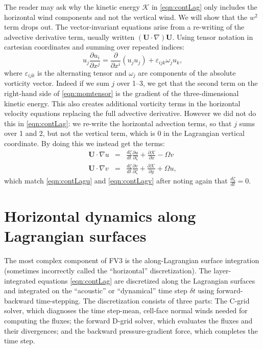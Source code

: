 \documentclass[10pt,letterpaper,margin=1in]{memoir}
\begin{document}
\begin{subappendices}
The reader may ask why the kinetic energy $\mathcal{K}$ in \eqref{eqn:contLag} only includes the horizontal wind components and not the vertical wind. We will show that the $w^2$ term drops out. The vector-invariant equations arise from a re-writing of the advective derivative term, usually written $\left (\mathbf{U} \cdot \nabla \right ) \mathbf{U} $. Using tensor notation in cartesian coordinates and summing over repeated indices:
\begin{equation} \label{eqn:momtensor}
u_j \frac{\partial u_i}{\partial x^j} = \frac{\partial}{\partial x^i} \left ( u_j u_j \right )  + \varepsilon_{ijk}\omega_j u_k,
\end{equation}
where $\varepsilon_{ijk}$ is the alternating tensor and $\omega_j$ are components of the absolute vorticity vector. Indeed if we sum $j$ over 1--3, we get that the second term on the right-hand side of \eqref{eqn:momtensor} is the gradient of the three-dimensional kinetic energy. This also creates additional vorticity terms in the horizontal velocity equations replacing the full advective derivative. However we did not do this in \eqref{eqn:contLag}: we re-write the horizontal advection terms, so that $j$ sums over 1 and 2, but not the vertical term, which is 0 in the Lagrangian vertical coordinate. By doing this we instead get the terms:
\begin{eqnarray}
\mathbf{U} \cdot \nabla u &=& \frac{d\zeta}{dt}\frac{\partial u}{\partial \zeta} + \frac{\partial \mathcal{K}}{\partial x} - \Omega v \\
\mathbf{U} \cdot \nabla v &=& \frac{d\zeta}{dt}\frac{\partial v}{\partial \zeta} + \frac{\partial \mathcal{K}}{\partial y} + \Omega u,
\end{eqnarray}
which match \eqref{eqn:contLagu} and \eqref{eqn:contLagv} after noting again that $\frac{d\zeta}{dt} = 0$.


\end{subappendices}

\chapter{Horizontal dynamics along Lagrangian surfaces} \label{chap:horiz}

The most complex component of FV3 is the along-Lagrangian surface integration (sometimes incorrectly called the ``horizontal'' discretization). The layer-integrated equations \eqref{eqn:contLag} are discretized along the Lagrangian surfaces and integrated on the ``acoustic'' or ``dynamical'' time step $\delta t$ using forward-backward time-stepping. The discretization consists of three parts: The C-grid solver, which diagnoses the time step-mean, cell-face normal winds needed for computing the fluxes; the forward D-grid solver, which evaluates the fluxes and their divergences; and the backward pressure-gradient force, which completes the time step. 
\end{document}
